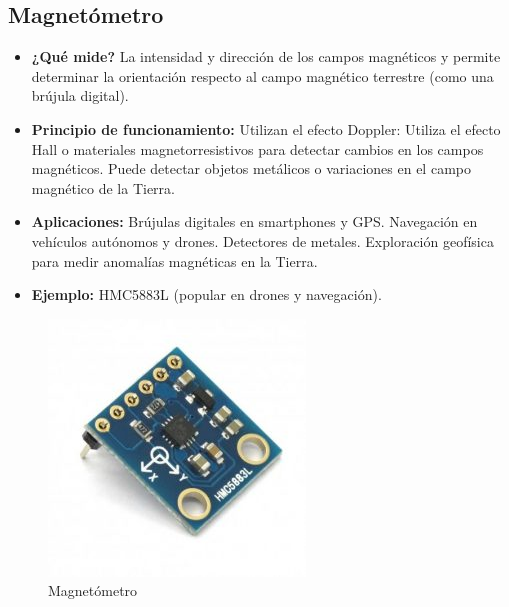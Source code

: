 \subsection*{Magnetómetro}
\begin{itemize}
	\item \textbf{¿Qué mide?} La intensidad y dirección de los campos magnéticos y permite determinar la orientación respecto al campo magnético terrestre (como una brújula digital).
	\item \textbf{Principio de funcionamiento:} Utilizan el efecto Doppler: Utiliza el efecto Hall o materiales magnetorresistivos para detectar cambios en los campos magnéticos.
	Puede detectar objetos metálicos o variaciones en el campo magnético de la Tierra.
	\item \textbf{Aplicaciones:} Brújulas digitales en smartphones y GPS.
	Navegación en vehículos autónomos y drones.
	Detectores de metales.
	Exploración geofísica para medir anomalías magnéticas en la Tierra.
	\item \textbf{Ejemplo:} HMC5883L (popular en drones y navegación).
		\cite{makeblock_sensores_2025}
\end{itemize}
\begin{figure}[h]
	\centering
	\includegraphics[width=0.3\linewidth]{img/magnetometro}
	\caption{Magnetómetro}
	\label{fig:magnetometro}
\end{figure}

